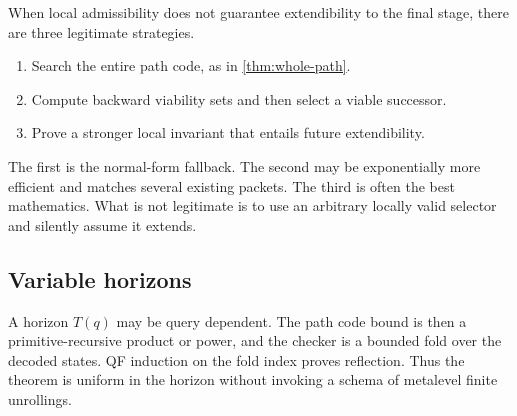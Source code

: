 When local admissibility does not guarantee extendibility to the final stage,
there are three legitimate strategies.

\begin{enumerate}
\item Search the entire path code, as in \cref{thm:whole-path}.
\item Compute backward viability sets and then select a viable successor.
\item Prove a stronger local invariant that entails future extendibility.
\end{enumerate}

The first is the normal-form fallback.  The second may be exponentially more
efficient and matches several existing packets.  The third is often the best
mathematics.  What is not legitimate is to use an arbitrary locally valid
selector and silently assume it extends.

\subsection{Variable horizons}

A horizon \(T(q)\) may be query dependent.  The path code bound is then a
primitive-recursive product or power, and the checker is a bounded fold over
the decoded states.  QF induction on the fold index proves reflection.  Thus
the theorem is uniform in the horizon without invoking a schema of metalevel
finite unrollings.

